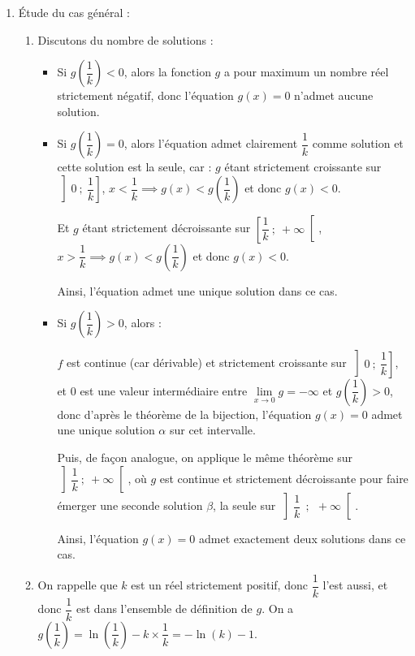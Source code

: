 \begin{enumerate}
\begin{enumerate}
\item On en déduit que sur son ensemble de définition, $f$ atteint un maximum égal à $-1$ pour $x = 1$, donc $f$ est à valeurs strictement négatives sur $\R^{*+}$.

Il n'y a donc aucune solution à l'équation $f(x) = 0$, or $f(x) = 0 \iff \ln(x) = x$, donc l'équation $\ln (x) = x$ n'admet aucune solution.
	\end{enumerate}
\item Étude du cas général :
	\begin{enumerate}
		\item Discutons du nombre de solutions :
\begin{itemize}
\item Si $g\left(\dfrac 1k\right)< 0$, alors la fonction $g$ a pour maximum un nombre réel strictement négatif, donc l'équation $g(x) = 0$ n'admet aucune solution.
\item Si $g\left(\dfrac 1k\right)= 0$, alors l'équation admet clairement $\dfrac{1}{k}$ comme solution et cette solution est la seule, car : $g$ étant strictement croissante sur $\left]0~;~\dfrac{1}{k}\right]$, $x < \dfrac{1}{k} \implies g(x) < g\left(\dfrac{1}{k}\right) $ et donc $g(x) < 0$.

Et $g$ étant strictement décroissante sur $\left[\dfrac{1}{k}~;~+\infty\right[$, $x > \dfrac{1}{k} \implies g(x) < g\left(\dfrac{1}{k}\right) $ et donc $g(x) < 0$.

Ainsi, l'équation admet une unique solution dans ce cas.

\item Si $g\left(\dfrac 1k\right)>0$, alors :

$f$ est continue (car dérivable) et strictement croissante sur $\left]0~;~\dfrac{1}{k}\right]$, et $0$ est une valeur intermédiaire entre $\lim\limits_{x \to 0}g = -\infty$ et $g\left(\dfrac{1}{k}\right)>0$, donc d'après le théorème de la bijection, l'équation $g(x) = 0$ admet une unique solution $\alpha$ sur cet intervalle.

Puis, de façon analogue, on applique le même théorème sur $\left]\dfrac{1}{k}~;~+\infty \right[$, où $g$ est continue et strictement décroissante pour faire émerger une seconde solution $\beta$, la seule sur $\left]\dfrac{1}{k}~~;~~+\infty \right[$.

Ainsi, l'équation $g(x) = 0$ admet exactement deux solutions dans ce cas.
\end{itemize}

		\item On rappelle que $k$ est un réel strictement positif, donc $\dfrac{1}{k}$ l'est aussi, et donc $\dfrac{1}{k}$ est dans l'ensemble de définition de $g$. On a $g\left(\dfrac 1k\right) = \ln\left(\dfrac 1k\right) - k\times \dfrac{1}{k} = -\ln(k) - 1$.


\end{enumerate}
\end{enumerate}
